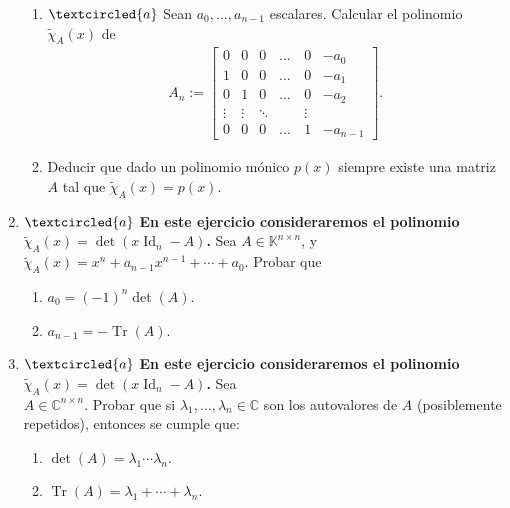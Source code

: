 \begin{enumerate}[resume,topsep=6pt,itemsep=.4cm]
\begin{enumerate}
\item\label{matriz de un polinomio} $\textcircled{a}$ Sean $a_0, ..., a_{n-1}$ escalares. Calcular el polinomio $\tilde\chi_A(x)$ de
\begin{align*}
A_n := \begin{bmatrix} 0 & 0 & 0 &\dots & 0 & -a_0 \\ 1 & 0 & 0&  \dots & 0  & -a_1 \\ 0 & 1 & 0&  \dots & 0  & -a_2 \\ \vdots & \vdots & \ddots & \quad  & \vdots\\ 0 & 0 & 0 & \dots & 1  & -a_{n-1}
\end{bmatrix}.        
 \end{align*}

 \item Deducir que dado un polinomio mónico $p(x)$ siempre existe una matriz $A$ tal que $\tilde\chi_A(x)=p(x)$.


\end{enumerate}


\item\label{tr det}$\textcircled{a}$ {\bf En este ejercicio consideraremos el polinomio $\tilde\chi_A(x)=\det(x\operatorname{Id}_n-A)$.}
Sea $A\in\mathbb{K}^{n\times n}$, y \ $\tilde\chi_A(x) = x^n+a_{n-1}x^{n-1}+\cdots+a_0$. Probar que


\begin{enumerate}
    \item $a_0 = (-1)^n \det(A)$.
    \item $a_{n-1} = - \operatorname{Tr}(A)$.
\end{enumerate}


\item\label{complejos} $\textcircled{a}$ {\bf En este ejercicio consideraremos el polinomio $\tilde\chi_A(x)=\det(x\operatorname{Id}_n-A)$.} Sea \\ $A\in\mathbb{C}^{n\times n}$. Probar que si $\lambda_1,\dots,\lambda_n \in \mathbb C$ son los autovalores de $A$
(posiblemente repetidos), entonces se cumple que:


\begin{enumerate}
    \item $\det(A)=\lambda_1\cdots \lambda_n$.
    \item $\operatorname{Tr}(A)=\lambda_1+\cdots+\lambda_n$.
\end{enumerate}


\end{enumerate}
